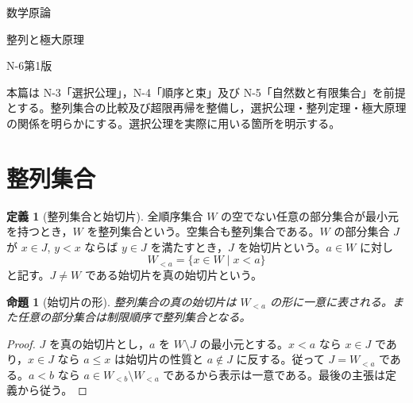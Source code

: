 \documentclass[a5paper,10pt,dvipdfmx]{jsarticle}
\theoremstyle{definition}
\newtheorem{defn}[ruledef]{定義}
\theoremstyle{plain}
\newtheorem{prop}[ruledef]{命題}
\begin{document}
\begin{center}
{\small 数学原論}\par\vspace{4mm}
{\LARGE 整列と極大原理}\par\vspace{2mm}
{\small N-6\quad 第1版}
\end{center}
本篇は N-3「選択公理」，N-4「順序と束」及び N-5「自然数と有限集合」を前提とする。整列集合の比較及び超限再帰を整備し，選択公理・整列定理・極大原理の関係を明らかにする。選択公理を実際に用いる箇所を明示する。
\section{整列集合}
\begin{defn}[整列集合と始切片]\label{k121}
全順序集合 $W$ の空でない任意の部分集合が最小元を持つとき，$W$ を整列集合という。空集合も整列集合である。$W$ の部分集合 $J$ が $x\in J$, $y<x$ ならば $y\in J$ を満たすとき，$J$ を始切片という。$a\in W$ に対し
\[ W_{<a}=\{x\in W\mid x<a\} \]
と記す。$J\ne W$ である始切片を真の始切片という。
\end{defn}
\begin{prop}[始切片の形]\label{k122}
整列集合の真の始切片は $W_{<a}$ の形に一意に表される。また任意の部分集合は制限順序で整列集合となる。
\end{prop}
\begin{proof}
$J$ を真の始切片とし，$a$ を $W\setminus J$ の最小元とする。$x<a$ なら $x\in J$ であり，$x\in J$ なら $a\leq x$ は始切片の性質と $a\notin J$ に反する。従って $J=W_{<a}$ である。$a<b$ なら $a\in W_{<b}\setminus W_{<a}$ であるから表示は一意である。最後の主張は定義から従う。
\end{proof}
\end{document}
